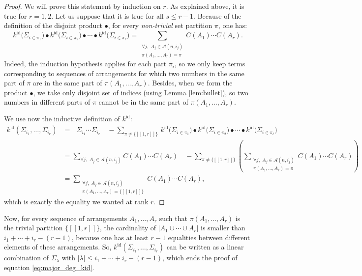 \documentclass[10pt]{amsart}
\theoremstyle{remark}
\newcommand{\Arr}{\mathcal{A}}
\newcommand{\lle}{\left[\!\left[}
\newcommand{\rre}{\right]\!\right]}
\newcommand{\id}{\mathrm{id}}
\begin{document}
\begin{proof}
We will prove this statement by induction on $r$. As explained above, it is true for $r=1,2$.
Let us suppose that it is true for all $s \leq r-1$. Because of the definition of the disjoint product $\bullet$, for every \emph{non-trivial} set partition $\pi$, one has: 
$$k^{\id}\big(\varSigma_{i \in \pi_1}\big) \bullet k^{\id}\big(\varSigma_{i \in \pi_2}\big) \bullet \cdots \bullet k^{\id}\big(\varSigma_{i \in \pi_\ell}\big)=\sum_{\substack{\forall j,\,\,A_j \in \Arr(n,i_j) \\  \pi(A_1,\ldots,A_r)=\pi} } C(A_1) \cdots C(A_r).$$
Indeed, the induction hypothesis applies for each part $\pi_i$, so we only keep terms corresponding to sequences of arrangements for which two numbers in the same part of $\pi$ are in the same part of $\pi(A_1,\ldots,A_r)$.
Besides, when we form the product $\bullet$, we take only disjoint set of indices (using Lemma \ref{lem:bullet}), so two numbers in different parts of $\pi$ cannot be in the same part of $\pi(A_1,\ldots,A_r)$.\bigskip

\noindent We use now the inductive definition of $k^{\id}$:
\begin{align*}
k^{\id}(\varSigma_{i_1},\ldots,\varSigma_{i_r}) &= \,\,\,\,\varSigma_{i_1} \cdots \varSigma_{i_r}\quad  - \sum_{\pi \neq \{\lle1,r\rre\}} \, k^{\id}\big(\varSigma_{i \in \pi_1}\big) \bullet k^{\id}\big(\varSigma_{i \in \pi_2}\big) \bullet \cdots \bullet k^{\id}\big(\varSigma_{i \in \pi_\ell}\big) \\
&=\sum_{ \forall j,\,\,A_j\in \Arr(n,i_j)} \!\!\!\!C(A_1) \cdots C(A_r) \quad - \sum_{\pi \neq \{\lle 1,r\rre \}} \left( \sum_{ \substack{ \forall j,\,\,A_j \in \Arr(n,i_j)\\ \pi(A_1,\ldots,A_r) =\pi}} C(A_1) \cdots C(A_r) \right)\\
& =\!\!\!\!\sum_{ \substack{\forall j,\,\,A_j \in \Arr(n,i_j) \\  \pi(A_1,\ldots,A_r)=\{\lle 1,r\rre\}}} \!\!\!\!\!\!\!\!C(A_1) \cdots C(A_r),\end{align*}
which is exactly the equality we wanted at rank $r$.
\end{proof}
Now, for every sequence of arrangements $A_1,\ldots,A_r$ such that $\pi(A_1,\ldots,A_r)$ is the trivial partition $\{\lle 1,r \rre\}$, the cardinality of $|A_1 \cup \cdots \cup A_r|$ is smaller than $i_1 + \cdots + i_r - (r-1)$, because one has at least $r-1$ equalities between different elements of these arrangements. So, $k^{\id}(\varSigma_{i_1},\ldots,\varSigma_{i_r})$ can be written as a linear combination of $\varSigma_{\lambda}$ with $|\lambda| \leq i_1 + \cdots + i_r - (r-1)$, which ends the proof of equation \eqref{eq:major_deg_kid}.\bigskip
\end{document}
